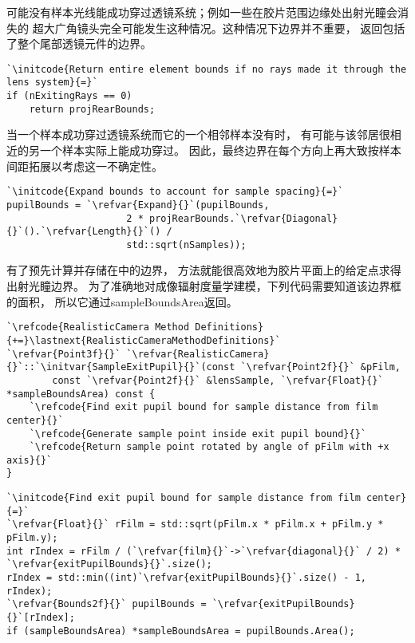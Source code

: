 可能没有样本光线能成功穿过透镜系统；例如一些在胶片范围边缘处出射光瞳会消失的
超大广角镜头完全可能发生这种情况。这种情况下边界并不重要，
返回包括了整个尾部透镜元件的边界。
\begin{lstlisting}
`\initcode{Return entire element bounds if no rays made it through the lens system}{=}`
if (nExitingRays == 0) 
    return projRearBounds;
\end{lstlisting}

当一个样本成功穿过透镜系统而它的一个相邻样本没有时，
有可能与该邻居很相近的另一个样本实际上能成功穿过。
因此，最终边界在每个方向上再大致按样本间距拓展以考虑这一不确定性。
\begin{lstlisting}
`\initcode{Expand bounds to account for sample spacing}{=}`
pupilBounds = `\refvar{Expand}{}`(pupilBounds,
                     2 * projRearBounds.`\refvar{Diagonal}{}`().`\refvar{Length}{}`() /
                     std::sqrt(nSamples));
\end{lstlisting}

有了预先计算并存储在中的边界，
方法就能很高效地为胶片平面上的给定点求得出射光瞳边界。
为了准确地对成像辐射度量学建模，下列代码需要知道该边界框的面积，
所以它通过{\ttfamily sampleBoundsArea}返回。
\begin{lstlisting}
`\refcode{RealisticCamera Method Definitions}{+=}\lastnext{RealisticCameraMethodDefinitions}` 
`\refvar{Point3f}{}` `\refvar{RealisticCamera}{}`::`\initvar{SampleExitPupil}{}`(const `\refvar{Point2f}{}` &pFilm,
        const `\refvar{Point2f}{}` &lensSample, `\refvar{Float}{}` *sampleBoundsArea) const {
    `\refcode{Find exit pupil bound for sample distance from film center}{}`
    `\refcode{Generate sample point inside exit pupil bound}{}`
    `\refcode{Return sample point rotated by angle of pFilm with +x axis}{}`
}
\end{lstlisting}
\begin{lstlisting}
`\initcode{Find exit pupil bound for sample distance from film center}{=}`
`\refvar{Float}{}` rFilm = std::sqrt(pFilm.x * pFilm.x + pFilm.y * pFilm.y);
int rIndex = rFilm / (`\refvar{film}{}`->`\refvar{diagonal}{}` / 2) * `\refvar{exitPupilBounds}{}`.size();
rIndex = std::min((int)`\refvar{exitPupilBounds}{}`.size() - 1, rIndex);
`\refvar{Bounds2f}{}` pupilBounds = `\refvar{exitPupilBounds}{}`[rIndex];
if (sampleBoundsArea) *sampleBoundsArea = pupilBounds.Area();
\end{lstlisting}

